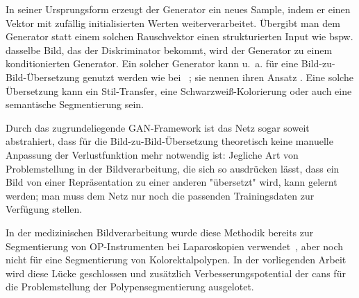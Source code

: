 In seiner Ursprungsform erzeugt der Generator ein neues Sample, indem er einen Vektor mit zufällig initialisierten Werten weiterverarbeitet.
Übergibt man dem Generator statt einem solchen Rauschvektor einen strukturierten Input wie bspw. dasselbe Bild, das der Diskriminator bekommt, wird der Generator zu einem konditionierten Generator.
Ein solcher Generator kann u.~a. für eine Bild-zu-Bild-Übersetzung genutzt werden wie bei \citeauthor{Isola.2017}~\cite{Isola.2017}; sie nennen ihren Ansatz \emph{}.
Eine solche Übersetzung kann ein Stil-Transfer, eine Schwarzweiß-Kolorierung oder auch eine semantische Segmentierung sein.

Durch das zugrundeliegende GAN-Framework ist das Netz sogar soweit abstrahiert, dass für die Bild-zu-Bild-Übersetzung theoretisch keine manuelle Anpassung der Verlustfunktion mehr notwendig ist:
Jegliche Art von Problemstellung in der Bildverarbeitung, die sich so ausdrücken lässt, dass ein Bild von einer Repräsentation zu einer anderen "übersetzt" wird, kann gelernt werden; man muss dem Netz nur noch die passenden Trainingsdaten zur Verfügung stellen.

In der medizinischen Bildverarbeitung wurde diese Methodik bereits zur Segmentierung von OP-Instrumenten bei Laparoskopien verwendet~\cite{Zisimopoulos.2017}, aber noch nicht für eine Segmentierung von Kolorektalpolypen.
In der vorliegenden Arbeit wird diese Lücke geschlossen und zusätzlich Verbesserungspotential der \glspl{can} für die Problemstellung der Polypensegmentierung ausgelotet.
